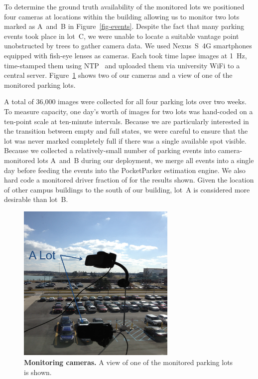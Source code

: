 To determine the ground truth availability of the monitored lots we
positioned four cameras at locations within the building allowing us to
monitor two lots marked as A~and~B in Figure~\ref{fig-events}. Despite the
fact that many parking events took place in lot~C, we were unable to locate a
suitable vantage point unobstructed by trees to gather camera data. We used
Nexus~S~4G smartphones equipped with fish-eye lenses as cameras. Each took
time lapse images at 1~Hz, time-stamped them using NTP~\cite{FIXME} and
uploaded them via university WiFi to a central server.
Figure~\ref{fig-camera} shows two of our cameras and a view of one of the
monitored parking lots.

A total of 36,000 images were collected for all four parking lots over two
weeks. To measure capacity, one day's worth of images for two lots was
hand-coded on a ten-point scale at ten-minute intervals. Because we are
particularly interested in the transition between empty and full states, we
were careful to ensure that the lot was never marked completely full if there
was a single available spot visible. Because we collected a relatively-small
number of parking events into camera-monitored lots A~and~B during our
deployment, we merge all events into a single day before feeding the events
into the PocketParker estimation engine. We also hard code a monitored driver
fraction of  for the results shown. Given the location of
other campus buildings to the south of our building, lot~A is considered more
desirable than lot~B.

\begin{figure}
\centering
\includegraphics[width=3.0in]{./figures/Camera_setting.pdf}

\caption{\textbf{Monitoring cameras.} A view of one of the monitored parking
lots is shown.}

\label{fig-camera}
\end{figure}
